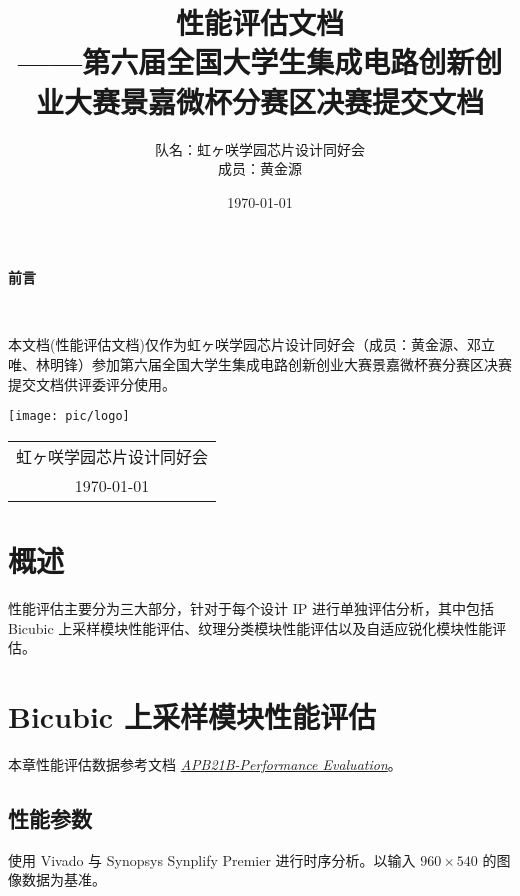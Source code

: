\documentclass[12pt, a4paper, oneside]{ctexbook}
\title{{\Huge{\textbf{性能评估文档}}}\normalsize{\\——第六届全国大学生集成电路创新创业大赛景嘉微杯分赛区决赛提交文档}}
\author{队名：虹ヶ咲学园芯片设计同好会\\ 成员：黄金源\space邓立唯\space林明锋}
\date{\today}
\begin{document}
	
	\maketitle	
	\setcounter{page}{1}
	\begin{center}
		\Huge\textbf{前言}
	\end{center}~\
	
	本文档(性能评估文档)仅作为虹ヶ咲学园芯片设计同好会（成员：黄金源、邓立唯、林明锋）参加第六届全国大学生集成电路创新创业大赛景嘉微杯赛分赛区决赛提交文档供评委评分使用。
	~\\
	\begin{flushright}
		\texttt{[image: pic/logo]}\\
		\begin{tabular}{c}
			虹ヶ咲学园芯片设计同好会\\
			\today
		\end{tabular}
	\end{flushright}
	\newpage
	\setcounter{page}{1}
	\tableofcontents
	\newpage
	\setcounter{page}{1}
	
	\chapter{概述}
	性能评估主要分为三大部分，针对于每个设计 IP 进行单独评估分析，其中包括 Bicubic 上采样模块性能评估、纹理分类模块性能评估以及自适应锐化模块性能评估。
	
	\chapter{Bicubic 上采样模块性能评估}
	本章性能评估数据参考文档 \href{./ref/APV21B_Performance_Evaluation.pdf}{\textit{APB21B-Performance Evaluation}}。
	\section{性能参数}
	使用 Vivado 与 Synopsys Synplify Premier 进行时序分析。以输入 $960\times540$ 的图像数据为基准。
\end{document}

